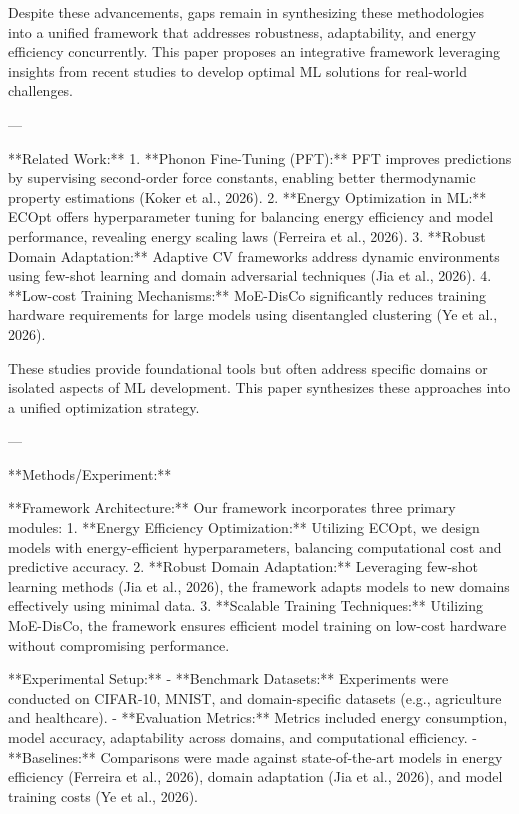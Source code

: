 Despite these advancements, gaps remain in synthesizing these methodologies into a unified framework that addresses robustness, adaptability, and energy efficiency concurrently. This paper proposes an integrative framework leveraging insights from recent studies to develop optimal ML solutions for real-world challenges.  

---

**Related Work:**  
1. **Phonon Fine-Tuning (PFT):** PFT improves predictions by supervising second-order force constants, enabling better thermodynamic property estimations (Koker et al., 2026).  
2. **Energy Optimization in ML:** ECOpt offers hyperparameter tuning for balancing energy efficiency and model performance, revealing energy scaling laws (Ferreira et al., 2026).  
3. **Robust Domain Adaptation:** Adaptive CV frameworks address dynamic environments using few-shot learning and domain adversarial techniques (Jia et al., 2026).  
4. **Low-cost Training Mechanisms:** MoE-DisCo significantly reduces training hardware requirements for large models using disentangled clustering (Ye et al., 2026).  

These studies provide foundational tools but often address specific domains or isolated aspects of ML development. This paper synthesizes these approaches into a unified optimization strategy.  

---

**Methods/Experiment:**  

**Framework Architecture:**  
Our framework incorporates three primary modules:  
1. **Energy Efficiency Optimization:** Utilizing ECOpt, we design models with energy-efficient hyperparameters, balancing computational cost and predictive accuracy.  
2. **Robust Domain Adaptation:** Leveraging few-shot learning methods (Jia et al., 2026), the framework adapts models to new domains effectively using minimal data.  
3. **Scalable Training Techniques:** Utilizing MoE-DisCo, the framework ensures efficient model training on low-cost hardware without compromising performance.  

**Experimental Setup:**  
- **Benchmark Datasets:** Experiments were conducted on CIFAR-10, MNIST, and domain-specific datasets (e.g., agriculture and healthcare).  
- **Evaluation Metrics:** Metrics included energy consumption, model accuracy, adaptability across domains, and computational efficiency.  
- **Baselines:** Comparisons were made against state-of-the-art models in energy efficiency (Ferreira et al., 2026), domain adaptation (Jia et al., 2026), and model training costs (Ye et al., 2026).  

